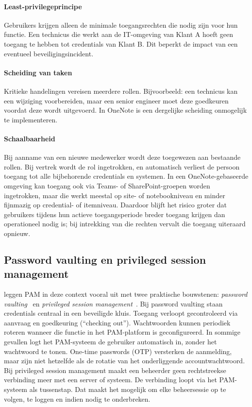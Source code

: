 \paragraph{Least-privilegeprincipe}
Gebruikers krijgen alleen de minimale toegangsrechten die nodig zijn voor hun functie. 
Een technicus die werkt aan de IT-omgeving van Klant A hoeft geen toegang te hebben tot credentials van Klant B. 
Dit beperkt de impact van een eventueel beveiligingsincident.

\paragraph{Scheiding van taken}
Kritieke handelingen vereisen meerdere rollen. Bijvoorbeeld: een technicus kan een wijziging voorbereiden, maar een senior engineer moet deze goedkeuren voordat deze wordt uitgevoerd. 
In OneNote is een dergelijke scheiding onmogelijk te implementeren.

\paragraph{Schaalbaarheid}
Bij aanname van een nieuwe medewerker wordt deze toegewezen aan bestaande rollen. Bij vertrek wordt de rol ingetrokken, en automatisch verliest de persoon toegang tot alle bijbehorende credentials en systemen. 
In een OneNote-gebaseerde omgeving kan toegang ook via Teams- of SharePoint-groepen worden ingetrokken, maar die werkt meestal op site- of notebookniveau en minder fijnmazig op credential- of itemniveau. Daardoor blijft het risico groter dat gebruikers tijdens hun actieve toegangsperiode breder toegang krijgen dan operationeel nodig is; bij intrekking van die rechten vervalt die toegang uiteraard opnieuw.

\subsection{Password vaulting en privileged session management}
\label{subsec:pam-vaulting-psm}

\textcite{garbis2021pam} leggen PAM in deze context vooral uit met twee praktische bouwstenen: \emph{password vaulting}~\autocite[pp.~155--156]{garbis2021pam} en \emph{privileged session management}~\autocite[pp.~157--158]{garbis2021pam}. 
Bij password vaulting staan credentials centraal in een beveiligde kluis. Toegang verloopt gecontroleerd via aanvraag en goedkeuring (\enquote{checking out}). Wachtwoorden kunnen periodiek roteren wanneer die functie in het PAM-platform is geconfigureerd. In sommige gevallen logt het PAM-systeem de gebruiker automatisch in, zonder het wachtwoord te tonen.
One-time passwords (OTP) versterken de aanmelding, maar zijn niet hetzelfde als de rotatie van het onderliggende accountwachtwoord.
Bij privileged session management maakt een beheerder geen rechtstreekse verbinding meer met een server of systeem. De verbinding loopt via het PAM-systeem als tussenstap. Dat maakt het mogelijk om elke beheersessie op te volgen, te loggen en indien nodig te onderbreken.

